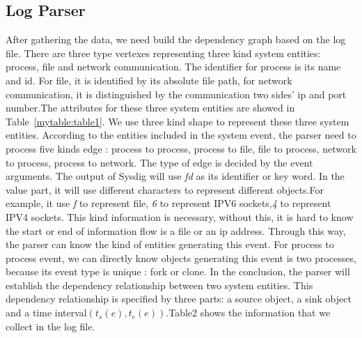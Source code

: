 \subsection{Log Parser}
After gathering the data, we need build the dependency graph based on the log file. There are three type vertexes representing three kind system entities: process, file and network communication.
The identifier for process is its name and id.  For file, it is identified by its absolute file path, for network communication, it is distinguished by the communication two sides' ip and port number.The attributes for these three system entities are showed in Table~\ref{mytable:table1}. We use three kind shape to represent these three system entities. According to the entities included in the system event, the parser need to process five kinds edge : process to process, process to file, file to process, network to process, process to network. The type of edge is decided by the event arguments. The output of Sysdig will use \textit{fd} as its identifier or key word. In the value part, it will use different characters to represent different objects.For example, it use \textit{f} to represent file, \textit{6} to represent IPV6 sockets,\textit{4} to represent IPV4 sockets. This kind information is necessary, without this, it is hard to know the start or end of information flow is a file or an ip address.  Through this way, the parser can know the kind of entities generating this event. For process to process event, we can directly know objects generating this event is two processes, because its event type is unique : fork or clone. In the conclusion, the parser will establish the dependency relationship between two system entities. This dependency relationship is specified by three parts: a source object, a sink object and a time interval$(t_s(e), t_e(e))$.Table2 shows the information that we collect in the log file.
\begin{table}[]
	\centering
	\caption{Representation Of System Entities}
	\label{mytable:table1}
\end{table}

